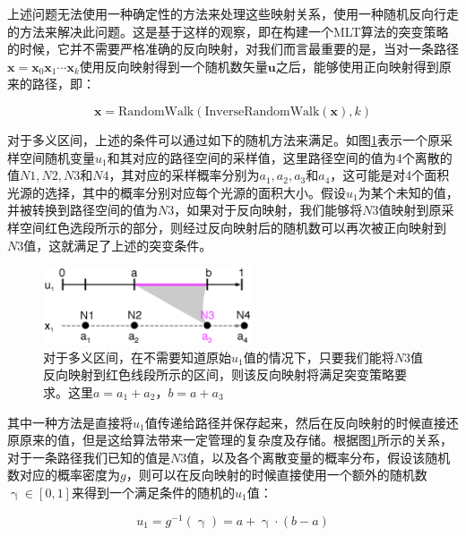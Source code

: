 上述问题无法使用一种确定性的方法来处理这些映射关系，\cite{a:ReversibleJumpMetropolisLightTransportusingInverseMappings,a:ChartedMetropolisLightTransport}使用一种随机反向行走的方法来解决此问题。这是基于这样的观察，即在构建一个MLT算法的突变策略的时候，它并不需要严格准确的反向映射，对我们而言最重要的是，当对一条路径${\mathbf{x}}=\mathbf{x}_0\mathbf{x}_1\cdots\mathbf{x}_k$使用反向映射得到一个随机数矢量$\mathbf{u}$之后，能够使用正向映射得到原来的路径，即：

\begin{equation}
	{\mathbf{x}}=\text{RandomWalk}(\text{InverseRandomWalk}({\mathbf{x}}),k)
\end{equation}

对于多义区间，上述的条件可以通过如下的随机方法来满足。如图\ref{f:mlt-intervals}表示一个原采样空间随机变量$u_1$和其对应的路径空间的采样值，这里路径空间的值为4个离散的值$N1,N2,N3$和$N4$，其对应的采样概率分别为$a_1,a_2,a_3$和$a_4$，这可能是对4个面积光源的选择，其中的概率分别对应每个光源的面积大小。假设$u_1$为某个未知的值，并被转换到路径空间的值为$N3$，如果对于反向映射，我们能够将$N3$值映射到原采样空间红色选段所示的部分，则经过反向映射后的随机数可以再次被正向映射到$N3$值，这就满足了上述的突变条件。

\begin{figure}
	\sidecaption
	\includegraphics[width=0.55\textwidth]{figures/mlt/intervals}
	\caption{对于多义区间，在不需要知道原始$u_1$值的情况下，只要我们能将$N3$值反向映射到红色线段所示的区间，则该反向映射将满足突变策略要求。这里$a=a_1+a_2$，$b=a+a_3$}
	\label{f:mlt-intervals}
\end{figure}

其中一种方法是直接将$u_1$值传递给路径并保存起来，然后在反向映射的时候直接还原原来的值，但是这给算法带来一定管理的复杂度及存储。根据图\ref{f:mlt-intervals}所示的关系，对于一条路径我们已知的值是$N3$值，以及各个离散变量的概率分布，假设该随机数对应的概率密度为$g$，则可以在反向映射的时候直接使用一个额外的随机数$\upgamma\in[0,1]$来得到一个满足条件的随机的$u_1$值：

\begin{equation}\label{e:mlt-intervals-1}
	u_1=g^{-1}(\upgamma)=a+\upgamma\cdot(b-a)
\end{equation}

